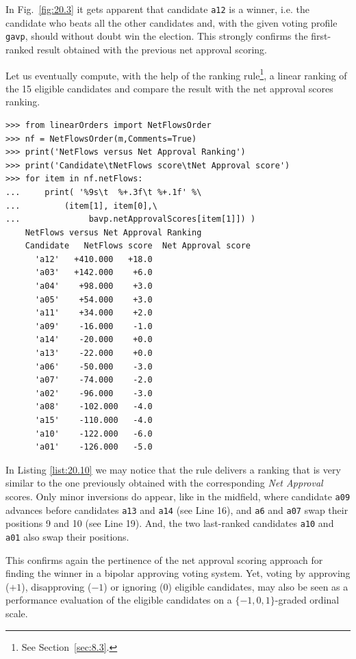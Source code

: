 In Fig.~\ref{fig:20.3} it gets apparent that candidate \texttt{a12} is a \Condorcet winner, i.e. the candidate who beats all the other candidates and, with the given voting profile \texttt{gavp}, should without doubt win the election. This strongly confirms the first-ranked result obtained with the previous net approval scoring. 

Let us eventually compute, with the help of the \NetFlows ranking rule\footnote{See Section~\ref{sec:8.3}.}, a linear ranking of the 15 eligible candidates and compare the result with the net approval scores ranking.
\begin{lstlisting}[caption={Comparing the net approval and the \NetFlows rankings},label=list:20.10]
>>> from linearOrders import NetFlowsOrder
>>> nf = NetFlowsOrder(m,Comments=True)
>>> print('NetFlows versus Net Approval Ranking')
>>> print('Candidate\tNetFlows score\tNet Approval score')
>>> for item in nf.netFlows:
...     print( '%9s\t  %+.3f\t %+.1f' %\
...	        (item[1], item[0],\
...              bavp.netApprovalScores[item[1]]) ) 
    NetFlows versus Net Approval Ranking
    Candidate	NetFlows score	Net Approval score
      'a12'	  +410.000	 +18.0
      'a03'	  +142.000	  +6.0
      'a04'	   +98.000	  +3.0
      'a05'	   +54.000	  +3.0
      'a11'	   +34.000	  +2.0
      'a09'	   -16.000	  -1.0
      'a14'	   -20.000	  +0.0
      'a13'	   -22.000	  +0.0
      'a06'	   -50.000	  -3.0
      'a07'	   -74.000	  -2.0
      'a02'	   -96.000	  -3.0
      'a08'	   -102.000	  -4.0
      'a15'	   -110.000	  -4.0
      'a10'	   -122.000	  -6.0
      'a01'	   -126.000	  -5.0
\end{lstlisting}
In Listing \ref{list:20.10} we may notice that the \NetFlows rule delivers a ranking that is very similar to the one previously obtained with the corresponding \emph{Net Approval} scores. Only minor inversions do appear, like in the midfield, where candidate \texttt{a09} advances before candidates \texttt{a13} and \texttt{a14} (see Line 16), and \texttt{a6} and \texttt{a07} swap their positions 9 and 10 (see Line 19). And, the two last-ranked candidates \texttt{a10} and \texttt{a01} also swap their positions.

This confirms again the pertinence of the net approval scoring approach for finding the winner in a bipolar approving voting system. Yet, voting by approving ($+1$), disapproving ($-1$) or ignoring ($0$) eligible candidates, may also be seen as a performance evaluation of the eligible candidates on a $\{-1, 0, 1\}$-graded ordinal scale.

